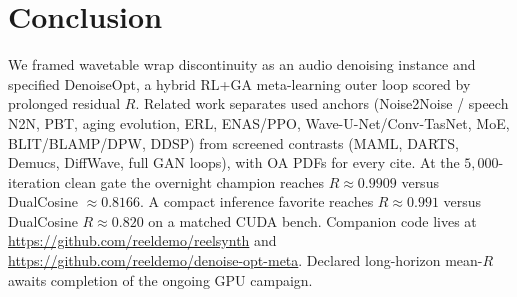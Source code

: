 \section{Conclusion}
\label{sec:conclusion}

We framed wavetable wrap discontinuity as an audio denoising instance and specified DenoiseOpt, a hybrid RL+GA meta-learning outer loop scored by prolonged residual $R$.
Related work separates used anchors (Noise2Noise / speech N2N, PBT, aging evolution, ERL, ENAS/PPO, Wave-U-Net/Conv-TasNet, MoE, BLIT/BLAMP/DPW, DDSP) from screened contrasts (MAML, DARTS, Demucs, DiffWave, full GAN loops), with OA PDFs for every cite.
At the $5{,}000$-iteration clean gate the overnight champion reaches $R\approx 0.9909$ versus DualCosine $\approx 0.8166$.
A compact inference favorite reaches $R\approx 0.991$ versus DualCosine $R\approx 0.820$ on a matched CUDA bench.
Companion code lives at \url{https://github.com/reeldemo/reelsynth} and \url{https://github.com/reeldemo/denoise-opt-meta}.
Declared long-horizon mean-$R$ awaits completion of the ongoing GPU campaign.
